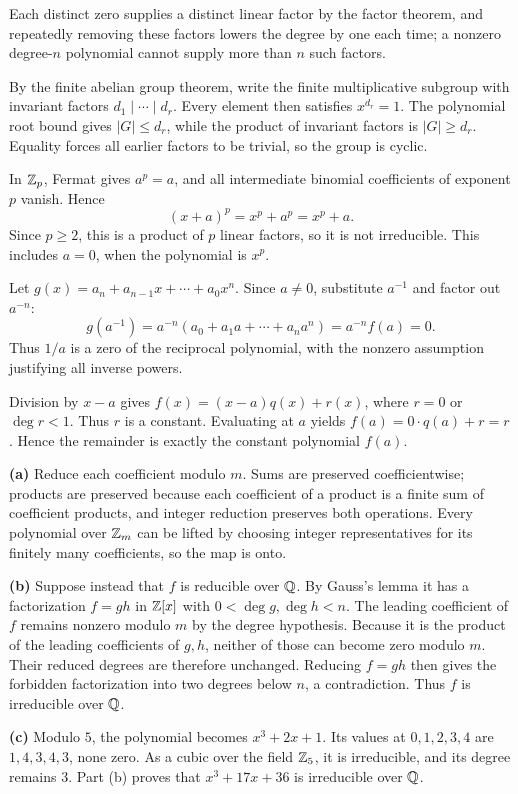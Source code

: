 Each distinct zero supplies a distinct linear factor by the factor theorem, and repeatedly removing these factors lowers the degree by one each time; a nonzero degree-$n$ polynomial cannot supply more than $n$ such factors.

By the finite abelian group theorem, write the finite multiplicative subgroup with invariant factors $d_1\mid\cdots\mid d_r$. Every element then satisfies $x^{d_r}=1$. The polynomial root bound gives $|G|\le d_r$, while the product of invariant factors is $|G|\ge d_r$. Equality forces all earlier factors to be trivial, so the group is cyclic.

In $\mathbb{Z}_p$, Fermat gives $a^p=a$, and all intermediate binomial coefficients of exponent $p$ vanish. Hence
\[(x+a)^p=x^p+a^p=x^p+a.
\]
Since $p\ge2$, this is a product of $p$ linear factors, so it is not irreducible. This includes $a=0$, when the polynomial is $x^p$.

Let $g(x)=a_n+a_{n-1}x+\cdots+a_0x^n$. Since $a\ne0$, substitute $a^{-1}$ and factor out $a^{-n}$:
\[g(a^{-1})=a^{-n}(a_0+a_1a+\cdots+a_na^n)=a^{-n}f(a)=0.
\]
Thus $1/a$ is a zero of the reciprocal polynomial, with the nonzero assumption justifying all inverse powers.

Division by $x-a$ gives $f(x)=(x-a)q(x)+r(x)$, where $r=0$ or $\deg r<1$. Thus $r$ is a constant. Evaluating at $a$ yields $f(a)=0\cdot q(a)+r=r$. Hence the remainder is exactly the constant polynomial $\boxed{f(a)}$.

\textbf{(a)} Reduce each coefficient modulo $m$. Sums are preserved coefficientwise; products are preserved because each coefficient of a product is a finite sum of coefficient products, and integer reduction preserves both operations. Every polynomial over $\mathbb{Z}_m$ can be lifted by choosing integer representatives for its finitely many coefficients, so the map is onto.\par
\textbf{(b)} Suppose instead that $f$ is reducible over $\mathbb{Q}$. By Gauss's lemma it has a factorization $f=gh$ in $\mathbb{Z}[x]$ with $0<\deg g,\deg h<n$. The leading coefficient of $f$ remains nonzero modulo $m$ by the degree hypothesis. Because it is the product of the leading coefficients of $g,h$, neither of those can become zero modulo $m$. Their reduced degrees are therefore unchanged. Reducing $f=gh$ then gives the forbidden factorization into two degrees below $n$, a contradiction. Thus $f$ is irreducible over $\mathbb{Q}$.\par
\textbf{(c)} Modulo $5$, the polynomial becomes $x^3+2x+1$. Its values at $0,1,2,3,4$ are $1,4,3,4,3$, none zero. As a cubic over the field $\mathbb{Z}_5$, it is irreducible, and its degree remains $3$. Part (b) proves that $x^3+17x+36$ is irreducible over $\mathbb{Q}$.
